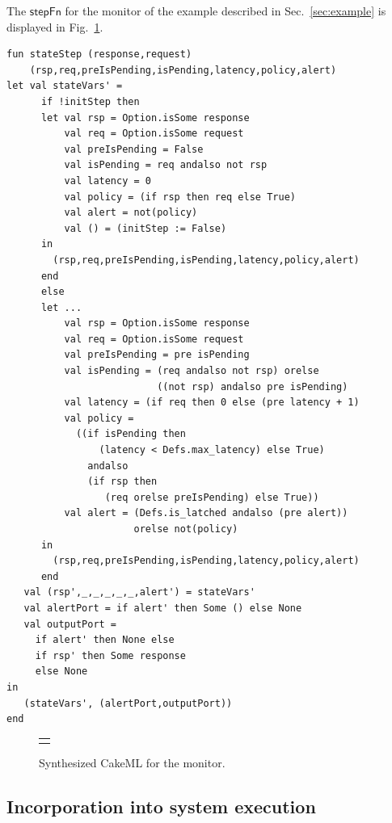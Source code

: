 \documentclass[global,twocolumn]{svjour}
\newcommand{\konst}[1]{\ensuremath{\mathsf{#1}}}
\newcommand{\figref}[1]{Fig.~\ref{#1}}
\newcommand{\secref}[1]{Sec.~\ref{#1}}
\begin{document}
The \konst{stepFn} for the monitor of the example described in \secref{sec:example} is displayed in \figref{fig:monitor-cakeml}.

\newsavebox{\monFn}
\begin{lrbox}{\monFn}
\begin{lstlisting}[style=myML]
fun stateStep (response,request)
    (rsp,req,preIsPending,isPending,latency,policy,alert)
let val stateVars' =
      if !initStep then
      let val rsp = Option.isSome response
          val req = Option.isSome request
          val preIsPending = False
          val isPending = req andalso not rsp
          val latency = 0
          val policy = (if rsp then req else True)
          val alert = not(policy)
          val () = (initStep := False)
      in
        (rsp,req,preIsPending,isPending,latency,policy,alert)
      end
      else
      let ...
          val rsp = Option.isSome response
          val req = Option.isSome request
          val preIsPending = pre isPending
          val isPending = (req andalso not rsp) orelse
                          ((not rsp) andalso pre isPending)
          val latency = (if req then 0 else (pre latency + 1)
          val policy =
            ((if isPending then
                (latency < Defs.max_latency) else True)
              andalso
              (if rsp then
                 (req orelse preIsPending) else True))
          val alert = (Defs.is_latched andalso (pre alert))
                      orelse not(policy)
      in
        (rsp,req,preIsPending,isPending,latency,policy,alert)
      end
   val (rsp',_,_,_,_,_,alert') = stateVars'
   val alertPort = if alert' then Some () else None
   val outputPort =
     if alert' then None else
     if rsp' then Some response
     else None
in
   (stateVars', (alertPort,outputPort))
end
\end{lstlisting}
\end{lrbox}

\begin{figure}
  \begin{center}
    \begin{tabular}{c}
      \resizebox{\columnwidth}{!}{\usebox{\monFn}}
    \end{tabular}
  \end{center}
  \caption{Synthesized CakeML for the monitor.}
  \label{fig:monitor-cakeml}
\end{figure}

\subsection{Incorporation into system execution}
\end{document}
